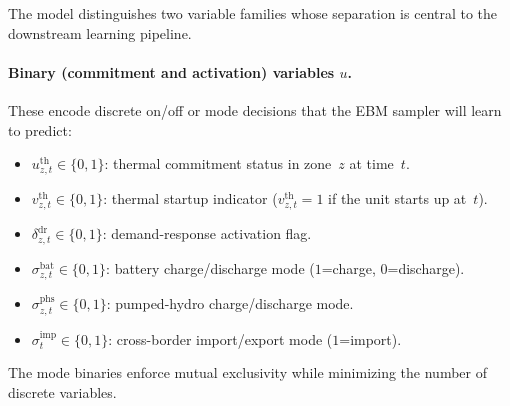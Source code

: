 \documentclass{article}
\begin{document}
The model distinguishes two variable families whose separation is central to the downstream learning pipeline.

\paragraph{Binary (commitment and activation) variables $u$.}
These encode discrete on/off or mode decisions that the EBM sampler will learn to predict:
\begin{itemize}[noitemsep]
  \item $u^{\mathrm{th}}_{z,t} \in \{0,1\}$: thermal commitment status in zone~$z$ at time~$t$.
  \item $v^{\mathrm{th}}_{z,t} \in \{0,1\}$: thermal startup indicator ($v^{\mathrm{th}}_{z,t} = 1$ if the unit starts up at~$t$).
  \item $\delta^{\mathrm{dr}}_{z,t} \in \{0,1\}$: demand-response activation flag.
  \item $\sigma^{\mathrm{bat}}_{z,t} \in \{0,1\}$: battery charge/discharge mode ($1$=charge, $0$=discharge). 
  \item $\sigma^{\mathrm{phs}}_{z,t} \in \{0,1\}$: pumped-hydro charge/discharge mode.
  \item $\sigma^{\mathrm{imp}}_{t} \in \{0,1\}$: cross-border import/export mode ($1$=import).
\end{itemize}

The mode binaries enforce mutual exclusivity while minimizing the number of discrete variables.
\end{document}
